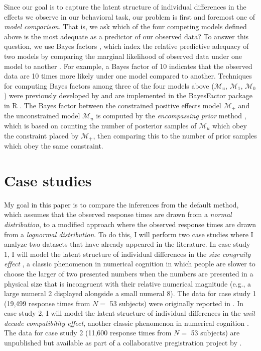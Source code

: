 \documentclass[12pt,twoside,a4paper]{article}
\begin{document}
Since our goal is to capture the latent structure of individual differences in the effects we observe in our behavioral task, our problem is first and foremost one of {\it model comparison}. That is, we ask which of the four competing models defined above is the most adequate as a predictor of our observed data? To answer this question, we use Bayes factors \citep{jeffreys1961, kass1995}, which index the relative predictive adequacy of two models by comparing the marginal likelihood of observed data under one model to another \citep{faulkenberry2020,faulkenberry2022}. For example, a Bayes factor of 10 indicates that the observed data are 10 times more likely under one model compared to another. Techniques for computing Bayes factors among three of the four models above (\(\mathcal{M}_u\), \(\mathcal{M}_1\), \(\mathcal{M}_0\)) were previously developed by \citet{rouder2012} and are implemented in the BayesFactor \citep{BayesFactor} package in R \citep{R}. The Bayes factor between the constrained positive effects model \(\mathcal{M}_+\) and the unconstrained model \(\mathcal{M}_u\) is computed by the \emph{encompassing prior} method \citep{klugkist2005,faulkenberry2019encompassing}, which is based on counting the number of posterior samples of \(\mathcal{M}_u\) which obey the constraint placed by \(\mathcal{M}_+\), then comparing this to the number of prior samples which obey the same constraint.

\section{Case studies}\label{case-studies}

My goal in this paper is to compare the inferences from the default \citet{haaf2017} method, which assumes that the observed response times are drawn from a \emph{normal distribution}, to a modified approach where the observed response times are drawn from a \emph{lognormal distribution}. To do this, I will perform two case studies where I analyze two datasets that have already appeared in the literature. In case study 1, I will model the latent structure of individual differences in the \emph{size congruity effect} \citep{henik1982}, a classic phenomenon in numerical cognition in which people are slower to choose the larger of two presented numbers when the numbers are presented in a physical size that is incongruent with their relative numerical magnitude (e.g., a large numeral 2 displayed alongside a small numeral 8). The data for case study 1 (19,499 response times from \(N=\) 53 subjects) were originally reported in \citet{faulkenberryBowman2020}. In case study 2, I will model the latent structure of individual differences in the \emph{unit decade compatibility effect}, another classic phenomenon in numerical cognition \citep{nuerk2001}. The data for case study 2 (11,600 response times from \(N=\) 53 subjects) are unpublished but available as part of a collaborative pregistration project by \citet{cipora2021}.
\end{document}
